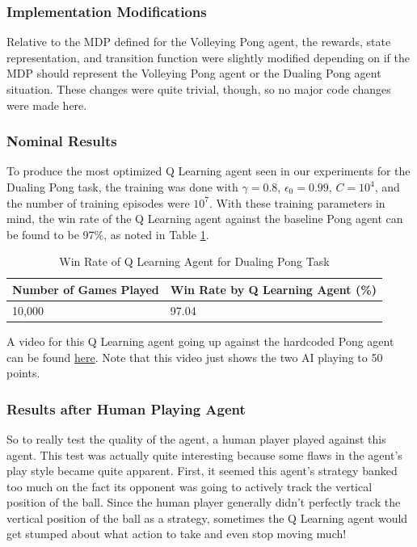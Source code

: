 \documentclass{article}[12pt]
\begin{document}
   \subsubsection{Implementation Modifications}
   Relative to the MDP defined for the Volleying Pong agent, the rewards, state representation, and transition function were slightly modified depending on if the MDP should represent the Volleying Pong agent or the Dualing Pong agent situation. These changes were quite trivial, though, so no major code changes were made here.
   
   \subsubsection{Nominal Results}
   To produce the most optimized Q Learning agent seen in our experiments for the Dualing Pong task, the training was done with $\gamma = 0.8$, $\epsilon_0 = 0.99$, $C = 10^4$, and the number of training episodes were $10^7$. With these training parameters in mind, the win rate of the Q Learning agent against the baseline Pong agent can be found to be 97\%, as noted in Table \ref{tab:p22}. 
   
    \begin{table}[ht]
   	\centering
   	\begin{tabular}{l | l }
   		\hline
   		Number of Games Played & Win Rate by Q Learning Agent (\%)  \\
   		\hline \hline 
   		10,000 &  97.04 \\
   		\hline
   	\end{tabular}
   	\caption{Win Rate of Q Learning Agent for Dualing Pong Task} \label{tab:p22}
   \end{table}
   
   A video for this Q Learning agent going up against the hardcoded Pong agent can be found \href{https://www.youtube.com/watch?v=FWLAqNOhF6I}{here}. Note that this video just shows the two AI playing to 50 points.
   
   \subsubsection{Results after Human Playing Agent}
   So to really test the quality of the agent, a human player played against this agent. This test was actually quite interesting because some flaws in the agent's play style became quite apparent. First, it seemed this agent's strategy banked too much on the fact its opponent was going to actively track the vertical position of the ball. Since the human player generally didn't perfectly track the vertical position of the ball as a strategy, sometimes the Q Learning agent would get stumped about what action to take and even stop moving much!
   
\end{document}
